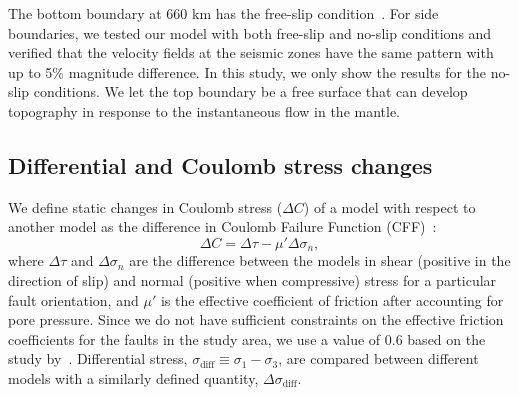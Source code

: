 \documentclass[draft,linenumbers]{agujournal2018}
\begin{document}
The bottom boundary at 660 km has the free-slip condition~\citep[e.g.,][]{arcay2007slab, billen2007rheologic, quinquis2011role}. For side boundaries, we tested our model with both free-slip and no-slip conditions and verified that the velocity fields at the seismic zones have the same pattern with up to 5\% magnitude difference. In this study, we only show the results for the no-slip conditions. We let the top boundary be a free surface that can develop topography in response to the instantaneous flow in the mantle. 

\subsection{Differential and Coulomb stress changes}
We define static changes in Coulomb stress ($\Delta C$) of a model with respect to another model as the difference in Coulomb Failure Function (CFF)~\citep{king1994static}:
%
\begin{equation}
    \Delta C = \Delta \tau - \mu' \Delta \sigma_n,
\end{equation}
%
where $\Delta \tau$ and $\Delta\sigma_n$ are the difference between the models in shear (positive in the direction of slip) and normal (positive when compressive) stress for a particular fault orientation, and $\mu'$ is the effective coefficient of friction after accounting for pore pressure. Since we do not have sufficient constraints on the effective friction coefficients for the faults in the study area, we use a value of 0.6 based on the study by~\citet{hurd2012intraplate}. Differential stress, $\sigma_{\text{diff}} \equiv \sigma_{1}-\sigma_{3}$, are compared between different models with a similarly defined quantity, $\Delta \sigma_{\text{diff}}$.
\end{document}
